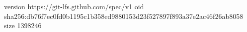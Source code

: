 version https://git-lfs.github.com/spec/v1
oid sha256:db76f7ec0fd0b1195c1b358ed9880153d23f527897f893a37e2ac46f26ab8058
size 1398246
